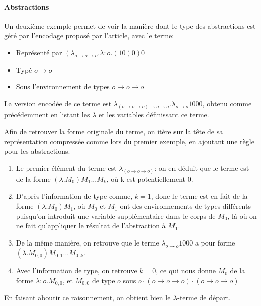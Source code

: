 \documentclass[titlepage]{article}
\providecommand{\tightlist}{%
  \setlength{\itemsep}{0pt}\setlength{\parskip}{0pt}}
\let\oldparagraph\paragraph
\renewcommand{\paragraph}[1]{\oldparagraph{#1}\mbox{}}
\begin{document}
\paragraph{Abstractions}

Un deuxième exemple permet de voir la manière dont le type des abstractions est géré
par l'encodage proposé par l'article, avec le terme:

\begin{itemize}
\tightlist
\item
  Représenté par $(\lambda_{o \rightarrow o \rightarrow o}.\lambda:o.(10)0)0$
\item
  Typé $o \rightarrow o$
\item
  Sous l'environnement de types $o \rightarrow o \rightarrow o$
\end{itemize}

La version encodée de ce terme est $\lambda_{(o \rightarrow o \rightarrow o) \rightarrow o \rightarrow o}.\lambda_{o \rightarrow o} 1 0 0 0$, obtenu comme
précédemment en listant les $\lambda$ et les variables définissant ce terme.

Afin de retrouver la forme originale du terme, on itère sur la tête de sa représentation
compressée comme lors du premier exemple, en ajoutant une règle pour les abstractions.

\begin{enumerate}
  \tightlist
  \item
    Le premier élément du terme est $\lambda_{(o \rightarrow o \rightarrow o)}$: on en déduit que le terme est de la forme $(\lambda.M_0)M_1...M_k$,
    où k est potentiellement 0.
  \item
    D'après l'information de type connue, $k = 1$, donc le terme est en fait de la forme $(\lambda.M_0)M_1$, où $M_0$ et $M_1$ ont des environnements de
    types différents puisqu'on introduit une variable supplémentaire dans le corps de $M_0$, là où on ne fait qu'appliquer le résultat de l'abstraction
    à $M_1$.
  \item
    De la même manière, on retrouve que le terme $\lambda_{o \rightarrow o} 1 0 0 0$ a pour forme $(\lambda.M_{0,0})M_{0,1}...M_{0,k}$.
  \item
    Avec l'information de type, on retrouve $k=0$, ce qui nous donne $M_0$ de la forme $\lambda:o.M_{0,0}$, et $M_{0,0}$ de type $o$ sous
    $o \cdot (o \rightarrow o \rightarrow o) \cdot (o \rightarrow o \rightarrow o)$
\end{enumerate}

En faisant aboutir ce raisonnement, on obtient bien le $\lambda$-terme de départ.
\end{document}
